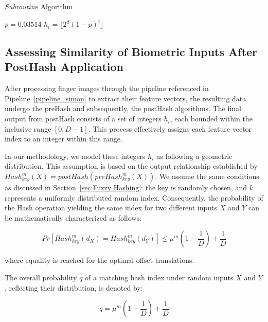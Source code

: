     \begin{algorithm}
    \begin{algorithmic}[1]
    \caption{\textit{Subroutine} Algorithm}
    \label{Subroutine Algorithm}
    \State $p = 0.03514$
    \State $h_i = \lfloor 2^d (1-p)^{i} \rfloor$
    \State {}
    \EndFunction
    \end{algorithmic}
    \end{algorithm}

\subsection{Assessing Similarity of Biometric Inputs After PostHash Application}
\label{sec:q}

After processing finger images through the pipeline referenced in Pipeline~\ref{pipeline_simon} to extract their feature vectors, the resulting data undergo the preHash and subsequently, the postHash algorithms. The final output from postHash consists of a set of integers \( h_i \), each bounded within the inclusive range \([0, D-1]\). This process effectively assigns each feature vector index to an integer within this range.

In our methodology, we model these integers \( h_i \) as following a geometric distribution. This assumption is based on the output relationship established by \( Hash_{key}^m(X) = postHash(preHash_{key}^m(X)) \). We assume the same conditions as discussed in Section~\ref{sec:Fuzzy Hashing}: the key is randomly chosen, and \(k\) represents a uniformly distributed random index. Consequently, the probability of the Hash operation yielding the same index for two different inputs \(X\) and \(Y\) can be mathematically characterized as follows:

\[Pr[Hash_{key}^m(d_X) = Hash_{key}^m(d_Y)] \leq \mu^m(1 - \frac{1}{D}) + \frac{1}{D}\]

where equality is reached for the optimal offset translations.

The overall probability \( q \) of a matching hash index under random inputs \( X \) and \( Y \), reflecting their distribution, is denoted by:

\begin{equation}
    q = \mu^m\left(1 - \frac{1}{D}\right) + \frac{1}{D}
    \label{eq:q_formula}
\end{equation}
    

